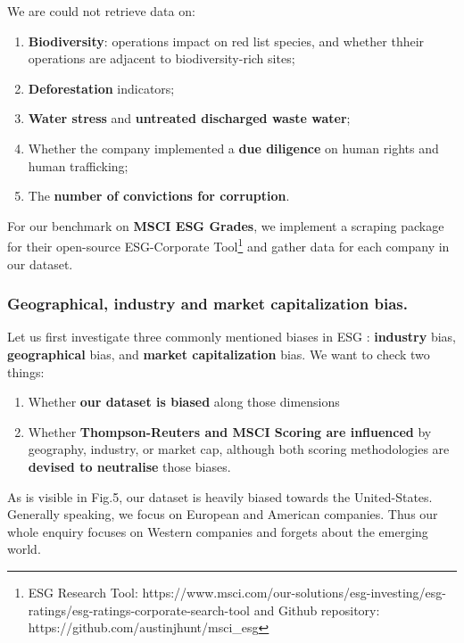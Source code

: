 \documentclass[12pt]{report}
\begin{document}
We are could not retrieve data on:  
\begin{enumerate}
\item \textbf{Biodiversity}: operations impact on red list species, and whether thheir operations are adjacent to biodiversity-rich sites;
\item \textbf{Deforestation} indicators;
\item \textbf{Water stress} and \textbf{untreated discharged waste water};
\item Whether the company implemented a \textbf{due diligence} on human rights and human trafficking;  
\item The \textbf{number of convictions for corruption}.
\end{enumerate}

For our benchmark on \textbf{MSCI ESG Grades}, we implement a scraping package for their open-source ESG-Corporate Tool\footnote{ESG Research Tool: https://www.msci.com/our-solutions/esg-investing/esg-ratings/esg-ratings-corporate-search-tool and Github repository: https://github.com/austinjhunt/msci\_esg} and gather data for each company in our dataset. 

\subsubsection{Geographical, industry and market capitalization bias.}

Let us first investigate three commonly mentioned biases in ESG : \textbf{industry} bias, \textbf{geographical} bias, and \textbf{market capitalization} bias.
We want to check two things:
\begin{enumerate}
    \item Whether \textbf{our dataset is biased} along those dimensions
    \item Whether \textbf{Thompson-Reuters and MSCI Scoring are influenced} by geography, industry, or market cap, although both scoring methodologies are \textbf{devised to neutralise} those biases.
\end{enumerate}
 
As is visible in Fig.5, our dataset is heavily biased towards the United-States. Generally speaking, we focus on European and American companies. Thus our whole enquiry focuses on Western companies and forgets about the emerging world. 
\end{document}
